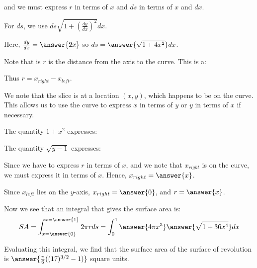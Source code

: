 \documentclass{ximera}
\begin{document}
\begin{exercise}
\begin{hint}
and we must express $r$ in terms of $x$ and $ds$ in terms of $x$ and $dx$.  

\begin{question}
For $ds$, we use $ds \sqrt{1+\left(\frac{dy}{dx}\right)^2} dx$.

Here, $\frac{dy}{dx}=\answer{2x}$ so $ds= \answer{\sqrt{1+ 4x^2}} dx$. 
\end{question}

\begin{question}
Note that is $r$ is the distance from the axis to the curve. This is a:

\begin{multipleChoice}
\end{multipleChoice} 
Thus $r=x_{right}-x_{left}$.  

We note that the slice is at a location $(x,y)$, which happens to be on the curve.  This allows us to use the curve to express $x$ in terms of $y$ or $y$ in terms of $x$ if necessary.  

The quantity $1+x^2$ expresses:
\begin{multipleChoice}
\end{multipleChoice} 

The quantity $\sqrt{y-1}$ expresses:
\begin{multipleChoice}
\end{multipleChoice} 

Since we have to express $r$ in terms of $x$, and we note that $x_{right}$ is on the curve, we must express it in terms of $x$.  Hence, $x_{right} = \answer{x}$.

Since $x_{left}$ lies on the $y$-axis, $x_{right} = \answer{0}$, and $r= \answer{x}$.

\end{question}

\begin{question}
Now we see that an integral that gives the surface area is: 
\[
SA= \int_{x=\answer{0}}^{x=\answer{1}} 2 \pi r ds = \int_0^1 \answer{4 \pi x^3} \answer{\sqrt{1+36x^4}} dx 
\]

\end{question}
\end{hint}

\begin{exercise}
Evaluating this integral, we find that the surface area of the surface of revolution is $\answer{\frac{\pi}{6} ((17)^{3/2} -1)}$ square units. 



\end{exercise}
\end{exercise}
\end{document}
